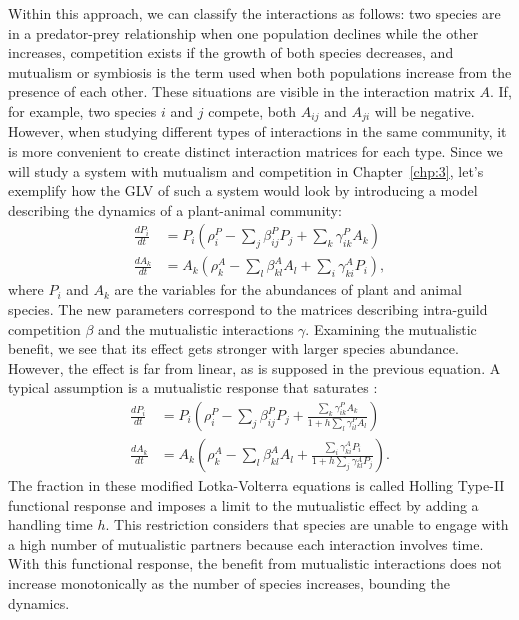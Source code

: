 Within this approach, we can classify the interactions as follows: two species are in a predator-prey relationship when one population declines while the other increases, competition exists if the growth of both species decreases, and mutualism or symbiosis is the term used when both populations increase from the presence of each other. These situations are visible in the interaction matrix $A$. If, for example, two species $i$ and $j$ compete, both $A_{ij}$ and $A_{ji}$ will be negative. However, when studying different types of interactions in the same community, it is more convenient to create distinct interaction matrices for each type. Since we will study a system with mutualism and competition in Chapter~\ref{chp:3}, let's exemplify how the GLV of such a system would look by introducing a model describing the dynamics of a plant-animal community:
\begin{equation}
\label{eq:LVcm}
{\begin{aligned}{\frac {dP_i}{dt}}&=P_i \left(\rho_i^P - \sum_j \beta_{ij}^{P}P_j + \sum_k \gamma_{ik}^{P} A_k \right) \\[6pt]
{\frac {dA_k}{dt}}&=A_k \left(\rho_k^A - \sum_l \beta_{kl}^{A}A_l + \sum_i \gamma_{ki}^{A} P_i \right),
\end{aligned}}
\end{equation}
where $P_i$ and $A_k$ are the variables for the abundances of plant and animal species. The new parameters correspond to the matrices describing intra-guild competition $\beta$ and the mutualistic interactions $\gamma$. Examining the mutualistic benefit, we see that its effect gets stronger with larger species abundance. However, the effect is far from linear, as is supposed in the previous equation. A typical assumption is a mutualistic response that saturates \cite{bastolla2009mutualism,rohr2014structural, suweis2013emergence}:
\begin{equation}
\label{eq:LVcmholling}
{\begin{aligned}{\frac {dP_i}{dt}}&=P_i \left(\rho_i^P - \sum_j \beta_{ij}^{P}P_j + \frac{\sum_k \gamma_{ik}^{P}A_k }{1+ h \sum_l \gamma_{il}^{P} A_l} \right) \\[6pt]
{\frac {dA_k}{dt}}&=A_k \left(\rho_k^A - \sum_l \beta_{kl}^{A}A_l + \frac{\sum_i \gamma_{ki}^{A}P_i }{1+ h \sum_j \gamma_{kl}^{A} P_j}\right).
\end{aligned}}
\end{equation}
The fraction in these modified Lotka-Volterra equations is called Holling Type-II functional response and imposes a limit to the mutualistic effect by adding a handling time $h$. This restriction considers that species are unable to engage with a high number of mutualistic partners because each interaction involves time. With this functional response, the benefit from mutualistic interactions does not increase monotonically as the number of species increases, bounding the dynamics.




